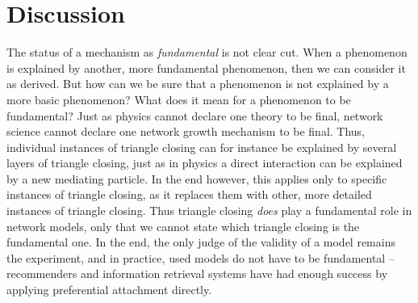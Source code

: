 \documentclass{jimis}
\begin{document}

\section{Discussion}
The status of a mechanism as \emph{fundamental} is not clear cut.  When
a phenomenon is explained by another, more fundamental phenomenon, then
we can consider it as derived.  But how can we be sure that a phenomenon
is not explained by a more basic phenomenon?  What does it mean for a
phenomenon to be fundamental?  Just as physics cannot declare one theory
to be final, network science cannot declare one network growth mechanism
to be final.  Thus, individual instances of triangle closing can for
instance be explained by several layers of triangle closing, just as in
physics a direct interaction can be explained by a new mediating
particle.  In the end however, this applies only to specific instances
of triangle closing, as it replaces them with other, more detailed
instances of triangle closing.  Thus triangle closing \emph{does} play a
fundamental role in network models, only that we cannot state which
triangle closing is the fundamental one.  In the end, the only judge of
the validity of a model remains the experiment, and in practice, used
models do not have to be fundamental -- recommenders and information
retrieval systems have had enough success by applying 
preferential attachment directly.



\end{document}
